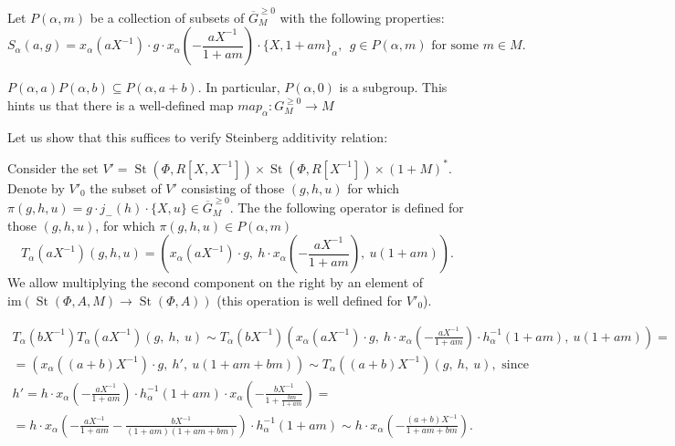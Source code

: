 \documentclass[oneside, 8pt]{amsart}
\theoremstyle{remark}
\theoremstyle{definition}
\DeclareMathOperator{\St}{St}
\numberwithin{equation}{section}
\begin{document}
Let $P(\alpha, m)$ be a collection of subsets of $\overline{G}^{\geq 0}_M$ with the following properties:
\[ S_\alpha(a, g) = x_\alpha(aX^{-1})\cdot g \cdot x_\alpha\left(-\frac{aX^{-1}}{1 + am}\right) \cdot \{X, 1+ am\}_\alpha,\ \ g \in P(\alpha, m)\text{ for some $m \in M$}.\]

$P(\alpha, a) P(\alpha, b) \subseteq P(\alpha, a + b)$.
In particular, $P(\alpha, 0)$ is a subgroup.
This hints us that there is a well-defined map $map_\alpha \colon G_M^{\geq 0} \to M$

Let us show that this suffices to verify Steinberg additivity relation:

Consider the set $V' = \St(\Phi, R[X, X^{-1}]) \times \St(\Phi, R[X^{-1}]) \times (1 + M)^*$.
Denote by $V'_0$ the subset of $V'$ consisting of those $(g, h, u)$ for which $\pi(g, h, u) = g \cdot j_-(h) \cdot \{ X, u \} \in \overline{G}_M^{\geq 0}$.
The the following operator is defined for those $(g, h, u)$, for which $\pi(g, h, u) \in P(\alpha, m)$
\[ T_\alpha(aX^{-1})(g, h, u) = \left( x_\alpha(aX^{-1})\cdot g ,\
                                         h \cdot x_\alpha\left(-\frac{aX^{-1}}{1 + am}\right),\ 
                                         u(1 + am)\right).\]
We allow multiplying the second component on the right by an element of $\mathrm{im}(\St(\Phi, A, M) \to \St(\Phi, A))$
 (this operation is well defined for $V'_0$).

\begin{multline}
 T_\alpha(bX^{-1}) T_\alpha(aX^{-1}) \left(g,\ h,\ u\right) \sim
T_\alpha(bX^{-1}) \left(x_\alpha(aX^{-1})\cdot g,\ h \cdot x_\alpha\left(-\frac{aX^{-1}}{1 + am}\right) \cdot h^{-1}_\alpha(1 + am),\ u(1 + am)\right) = \\
 = \left( x_\alpha\left((a+b)X^{-1}\right)\cdot g,\ h',\ u(1 + am + bm) \right) \sim T_\alpha((a+b)X^{-1}) \left( g,\ h,\ u\right),\text{ since} \end{multline} 
 \begin{multline}
h' = h \cdot x_\alpha\left(-\frac{aX^{-1}}{1+am}\right) \cdot h^{-1}_\alpha(1+am) \cdot x_\alpha\left(-\frac{bX^{-1}}{1 + \frac{bm}{1+am}}\right) = \\ = 
 h \cdot x_\alpha\left(- \frac{aX^{-1}}{1 + am} - \frac{bX^{-1}}{(1+am)(1 + am + bm)}\right) \cdot h^{-1}_\alpha(1+am) \sim  
  h \cdot x_\alpha\left(- \frac{(a+b)X^{-1}}{1 + am + bm}\right).
\end{multline}
\end{document}

